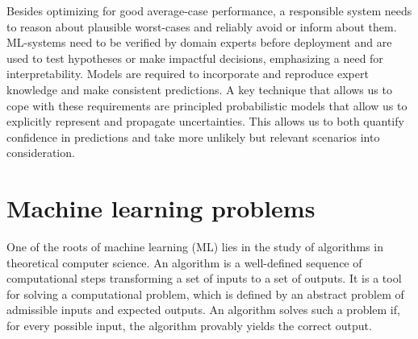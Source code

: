 Besides optimizing for good average-case performance, a responsible system needs to reason about plausible worst-cases and reliably avoid or inform about them.
ML-systems need to be verified by domain experts before deployment and are used to test hypotheses or make impactful decisions, emphasizing a need for interpretability.
Models are required to incorporate and reproduce expert knowledge and make consistent predictions.
A key technique that allows us to cope with these requirements are principled probabilistic models that allow us to explicitly represent and propagate uncertainties.
This allows us to both quantify confidence in predictions and take more unlikely but relevant scenarios into consideration.




\section{Machine learning problems}
\label{toc:bayesian_ml:ml_problems}
One of the roots of machine learning (ML) lies in the study of algorithms in theoretical computer science.
An algorithm is a well-defined sequence of computational steps transforming a set of inputs to a set of outputs.
It is a tool for solving a computational problem, which is defined by an abstract problem of admissible inputs and expected outputs.
An algorithm solves such a problem if, for every possible input, the algorithm provably yields the correct output.

